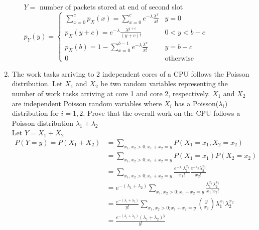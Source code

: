 \documentclass[10.5pt,letterpaper]{article}
\begin{document}
\begin{enumerate}[label=\textbf{Problem \arabic*.}]
\begin{enumerate}[label=\alph*)]
	$Y=$ number of packets stored at end of second slot\\
	$p_Y(y)=\begin{cases}
		\sum_{x=0}^{c}p_X(x)=\sum_{x=0}^ce^{-\lambda}\frac{\lambda^x}{x!} & y=0 \\
		p_X(y+c)=e^{-\lambda}\frac{\lambda^{y+c}}{(y+c)!} & 0<y<b-c\\
		p_X(b)=1-\sum_{x=0}^{b-1}e^{-\lambda}\frac{\lambda^x}{x!} & y=b-c \\
		0 & \text{otherwise}
	\end{cases}$
	\end{enumerate}
\item The work tasks arriving to 2 independent cores of a CPU follows the Poisson distribution. Let $X_1$ and $X_2$ be two random variables representing the number of work tasks arriving at core 1 and core 2, respectively. $X_1$ and $X_2$ are independent Poisson random variables where $X_i$ has a Poisson($\lambda_i$) distribution for $i=1,2$. Prove that the overall work on the CPU follows a Poisson distribution $\lambda_1+\lambda_2$\\
Let $Y = X_1 + X_2$\\
\begin{equation*}\begin{split}
P(Y=y)=P(X_1+X_2) & =\sum_{x_1,x_2>0;x_1+x_2=y}P(X_1=x_1,X_2=x_2) \\
&= \sum_{x_1,x_2>0;x_1+x_2=y}P(X_1=x_1)P(X_2=x_2) \\
&= \sum_{x_1,x_2>0;x_1+x_2=y}\frac{e^{-\lambda_1}\lambda_1^{x_1}}{x_1!}\frac{e^{-\lambda_2}\lambda_2^{x_2}}{x_2!} \\
&= e^{-(\lambda_1+\lambda_2)}\sum_{x_1,x_2>0;x_1+x_2=y}\frac{\lambda_1^{x_1}\lambda_2^{x_2}}{x_1!x_2!}\\
&= \frac{e^{-(\lambda_1+\lambda_2)}}{y!}\sum_{x_1,x_2>0;x_1+x_2=y}{{y}\choose{x_2}}\lambda_1^{x_1}\lambda_2^{x_2} \\
&= \frac{e^{-(\lambda_1 + \lambda_2)}(\lambda_1+\lambda_2)^y}{y!}
\end{split}\end{equation*}
\end{enumerate}
\end{document}
